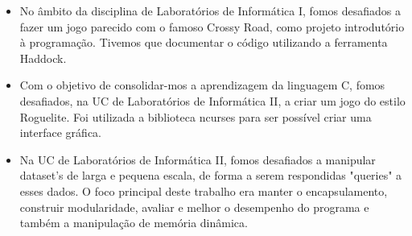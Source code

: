 \documentclass[10pt,a4paper,ragged2e]{altacv}
\begin{document}
\begin{itemize}
\item No âmbito da disciplina de Laboratórios de Informática I, fomos desafiados a fazer um jogo parecido com o famoso Crossy Road, como projeto introdutório à programação. Tivemos que documentar o código utilizando a ferramenta Haddock.
\end{itemize}
\smallskip
\smallskip
{}
\begin{itemize}
\item Com o objetivo de consolidar-mos a aprendizagem da linguagem C, fomos desafiados, na UC de Laboratórios de Informática II, a criar um jogo do estilo Roguelite. Foi utilizada a biblioteca ncurses para ser possível criar uma interface gráfica. 
\end{itemize}
\smallskip
\smallskip
{}
\begin{itemize}
\item Na UC de Laboratórios de Informática II, fomos desafiados a manipular dataset's de larga e pequena escala, de forma a serem respondidas "queries" a esses dados. O foco principal deste trabalho era manter o encapsulamento, construir modularidade, avaliar e melhor o desempenho do programa e também a manipulação de memória dinâmica.
\end{itemize}
\smallskip
\smallskip




\end{document}
